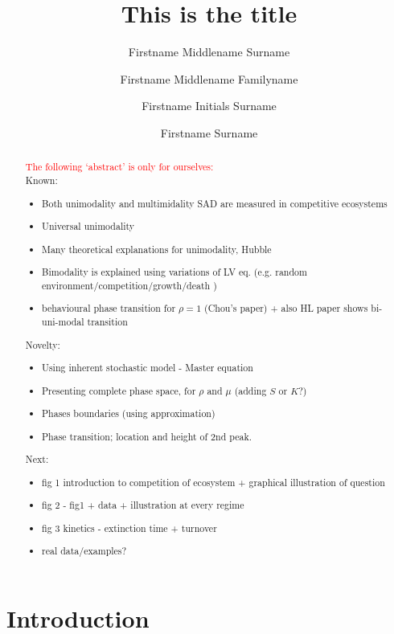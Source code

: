 \documentclass[9pt,lineno]{elife}
\title{This is the title}
\author[1*]{Firstname Middlename Surname}
\author[1,2\authfn{1}\authfn{3}]{Firstname Middlename Familyname}
\author[2\authfn{1}\authfn{4}]{Firstname Initials Surname}
\author[2*]{Firstname Surname}
\affil[1]{Institution 1}
\affil[2]{Institution 2}
\begin{document}
\maketitle

\begin{abstract}
\textcolor{red}{The following `abstract' is only for ourselves:} \\
Known:
\begin{itemize}
    \item Both unimodality and multimidality SAD are measured in competitive ecosystems
    \item Universal unimodality 
    \item Many theoretical explanations for unimodality, Hubble 
    \item Bimodality is explained using variations of LV eq.  (e.g. random environment/competition/growth/death ) 
    \item behavioural phase transition for $\rho=1$ (Chou's paper) + also HL paper shows bi-uni-modal transition 
\end{itemize}
Novelty:
\begin{itemize}
    \item Using inherent stochastic model - Master equation 
    \item Presenting complete phase space, for $\rho$ and $\mu$ (adding $S$ or $K$?)  
    \item Phases boundaries (using approximation)  
    \item Phase transition; location and height of 2nd peak.  
\end{itemize}
Next:
\begin{itemize}
    \item fig 1 introduction to competition of ecosystem
    + graphical illustration of question
    \item fig 2 - fig1 + data + illustration at every regime
    \item fig 3 kinetics - extinction time + turnover
    \item real data/examples?
\end{itemize}
\end{abstract}



\section{Introduction}
\label{sec:introduction}
\end{document}

